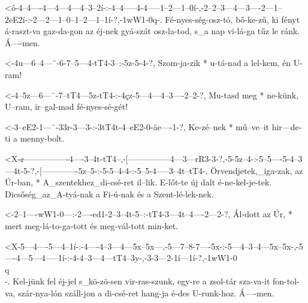 
  {<ô-4--4----4---4---4---4--3--2í-:-4--4-----4-4-----1--2---1--0í-,-2--2--3---4---3----2---1--2eE2í-:-2---2---1--0--1--2---1--1í-?,-1wW1-0q-.}
  {   Fé-nyes-ség-osz-tó, bő-ke-zű,  ki fényt á-raszt-va gaz-da-gon  az éj-nek gyá-szát osz-la-tod,    s_a nap vi-lá-ga tűz le ránk. Á----men.}

  {<-4u---6--4---¨-6-7--5---4-tT4-3--:-5z-5-4-?,}
  {  Szom-ja-zik * u-tá-nad a lel-kem, én U-ram!}

  {<-4--5z---6---¨-7--tT4---5z-tT4-:-4çz-5---4---4--3----2--2-?,}
  {  Mu-tasd meg * ne-künk, U--ram,  ir--gal-mad fé-nyes-sé-gét!}

  {<-3--eE2-1---¨-33r-3---3-:-3tT4t-4--eE2-0-äe----1-?,}
  {  Ke-zé--nek * mű--ve--it  hir---de-ti  a menny-bolt.}

  {<X-¢----------------4----3--4t-tT4--,-[---------------4---3---rR3-3-?,-5-5z--4-:-5--5----5-4--3---4t-5-?,-[-------------5z--5-:-5-5--4-4-:-5--5-4-----3--4t--tT4-.}
  {   Örvendjetek,_iga-zak, az Úr-ban, * A_szentekhez_di-csé-ret il--lik. E-lőt-te  új dalt é-ne-kel-je-tek. Dicsőség_az_A-tyá-nak a Fi-ú-nak és a Szent-lé-lek-nek.}

  {<-2--1----wW1-0---:-2----ed1-2--3--4t-5--:-tT4-3---4t--4----2---2-?,}
  {  Ál-dott az  Úr, * mert meg-lá-to-ga-tott és  meg-vál-tott min-ket.}



  {<X-5---4----5---4--1í-:-4----4--3---4---5x--5x---,-5---7--8-7----5x-:-5---4--3--4---5x--5x-,-5----4---5---4-----1í-:-4-4--3---4---tT4--3y-,-3-3---2-1í---1í-?,-1wW1-0\\q\\-.}
  {   Kel-jünk fel éj-jel  s_kö-zö-sen vir-ras-szunk, egy-re a zsol-tár  sza-va-it fon-tol-va,  szár-nya-lón száll-jon  a di-csé-ret hang-ja   é-des U-runk-hoz.  Á----men.}

